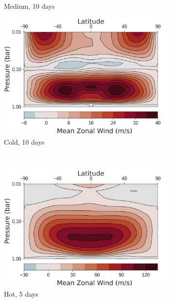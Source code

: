 \begin{figure}
\begin{subfigure}[b]{0.32\textwidth}
    \caption{Medium, 10 days}
  \end{subfigure}
  \begin{subfigure}[b]{0.32\textwidth}
    \includegraphics[width=\textwidth]{figures/eqm-zonal-flow/wind-cold-10.pdf}
    \caption{Cold, 10 days}
  \end{subfigure}
    \\
    \begin{subfigure}[b]{0.32\textwidth}
      \includegraphics[width=\textwidth]{figures/eqm-zonal-flow/wind-hot-5.pdf}
      \caption{Hot, 5 days}
    \end{subfigure}
    \begin{subfigure}[b]{0.32\textwidth}

\end{subfigure}
\end{figure}
